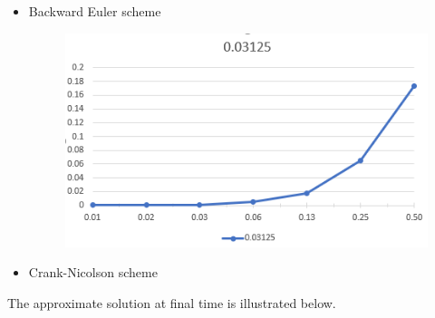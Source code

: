 \begin{itemize}
	\item Backward Euler scheme
	\begin{figure}[h!]
		\centering
		\includegraphics[width=\linewidth]{graph}
	\end{figure}
	\item Crank-Nicolson scheme
\end{itemize}
The approximate solution at final time is illustrated below.
